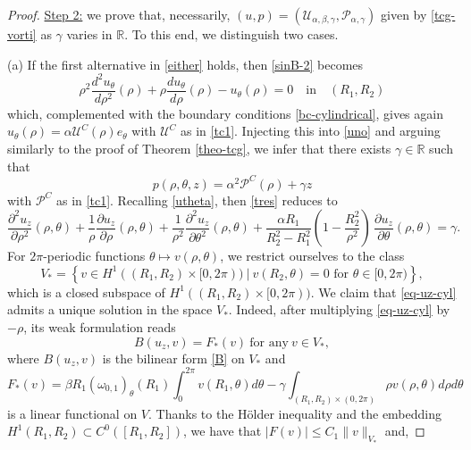 \documentclass[a4paper,11pt]{amsart}
\numberwithin{equation}{section}
\numberwithin{figure}{section}
\newcommand{\R}{\mathbb{R}}
\def\U{{\mathcal U}}
\def\P{{\mathcal P}}
\begin{document}
\begin{proof}
		\underline{Step 2:} we prove that, necessarily, $(u,p)=(\U_{\alpha,\beta,\gamma}, \P_{\alpha,\gamma})$ given by \eqref{tcg-vorti} as $\gamma$ varies in  $\mathbb{R}$. To this end, we distinguish two cases.\par
		(a) If the first alternative in \eqref{either} holds, then \eqref{sinB-2} becomes
		$$
		\rho^2\frac{d^2 u_{\theta}}{d\rho^2}(\rho)+\rho\frac{du_{\theta}}{d\rho}(\rho)-u_\theta(\rho)=0\quad\text{in}\quad (R_1,R_2)
		$$
		which, complemented with the boundary conditions \eqref{bc-cylindrical}, gives again $u_\theta(\rho)= \alpha\U^C(\rho)e_\theta$ with $\U^C$ as in \eqref{tc1}.
		Injecting this into \eqref{uno} and arguing similarly to the proof of Theorem \ref{theo-tcg}, we infer that there exists $\gamma\in\R$ such that
		\begin{equation}\label{sepa-pres2}
			p(\rho, \theta, z)=\alpha^2\P^C(\rho)+\gamma z
		\end{equation}with $\mathcal{P}^C$ as in \eqref{tc1}.
		Recalling \eqref{utheta}, then \eqref{tres} reduces to
		\begin{equation}\label{eq-uz-cyl}
			\frac{\partial^2 u_z}{\partial\rho^2}(\rho,\theta)+\frac{1}{\rho}\frac{\partial u_z}{\partial\rho}(\rho,\theta)+
			\frac{1}{\rho^2}\frac{\partial^2 u_z}{\partial\theta^2}(\rho,\theta)+
			\frac{\alpha R_1 }{R_2^2 -R_1^2} \left(1-\frac{R_2^2}{\rho^2}\right)\, \frac{\partial u_z}{\partial\theta}(\rho,\theta)=\gamma .
		\end{equation}
		For $2\pi$-periodic functions $\theta\mapsto v(\rho, \theta)$, we restrict ourselves to the class
		\begin{equation}\label{V*}
			V_*=\left\{v\in H^1((R_1,R_2)\times [0,2\pi)) \ | \ v(R_2,\theta)=0  \text{ for $\theta\in[0,2\pi)$}\right\},
		\end{equation}which is a closed subspace of $H^1((R_1,R_2)\times [0,2\pi))$. We claim that \eqref{eq-uz-cyl} admits a unique solution in the space $V_*$. Indeed, after multiplying \eqref{eq-uz-cyl} by $-\rho$, its weak formulation reads
		\begin{equation}\label{var-form2}
			B(u_z, v)= F_*(v) \ \text{for any} \ v\in V_*,
		\end{equation}
		where $B(u_z,v)$ is the bilinear form \eqref{B} on $V_*$ and $$F_*(v)=\beta R_1(\omega_{0,1})_\theta(R_1)\int_{0}^{2\pi}v(R_1,\theta)d\theta -\gamma\int_{(R_1,R_2)\times (0,2\pi)} \rho v(\rho, \theta) d\rho d\theta$$ is a linear functional on $V$. Thanks to the Hölder inequality and the embedding $H^1 (R_1,R_2)\subset C^0([R_1,R_2])$, we have that $|F(v)|\leq C_1\|v\|_{V_*}$ and,

\end{proof}
\end{document}
